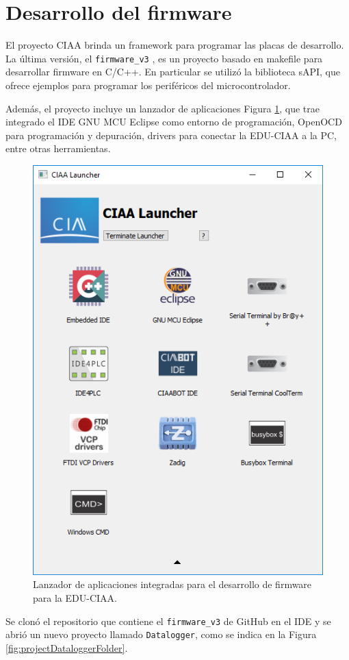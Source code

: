 \section{Desarrollo del firmware}\label{sec:desarrolloFirmware}

El proyecto CIAA brinda un framework para programar las placas de desarrollo. La última versión, el \texttt{firmware\_v3} \cite{ciaa2024}, es un proyecto basado en makefile para desarrollar firmware en C/C++. En particular se utilizó la biblioteca sAPI, que ofrece ejemplos para programar los periféricos del microcontrolador.

Además, el proyecto incluye un lanzador de aplicaciones Figura \ref{fig:ciaaLauncher}, que trae integrado el IDE GNU MCU Eclipse como entorno de programación, OpenOCD para programación y depuración, drivers para conectar la EDU-CIAA a la PC, entre otras herramientas. 

\begin{figure}[H]
    \centering
    \includegraphics[width=0.35\linewidth]{Figuras/datalogger/Firmware/ciaaLauncher.png}
    \caption{Lanzador de aplicaciones integradas para el desarrollo de firmware para la EDU-CIAA.}
    \label{fig:ciaaLauncher}
\end{figure}

Se clonó el repositorio que contiene el \texttt{firmware\_v3} de GitHub en el IDE y se abrió un nuevo proyecto llamado \texttt{Datalogger}, como se indica en la Figura \ref{fig:projectDataloggerFolder}.

